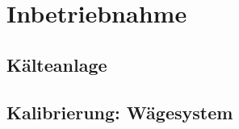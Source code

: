 \chapter{Inbetriebnahme}
\label{cha:Inbetriebnahme}


\section{Kälteanlage}
\label{sec:Inbetriebnahme_KA}


\section{Kalibrierung: Wägesystem}
\label{sec:}
